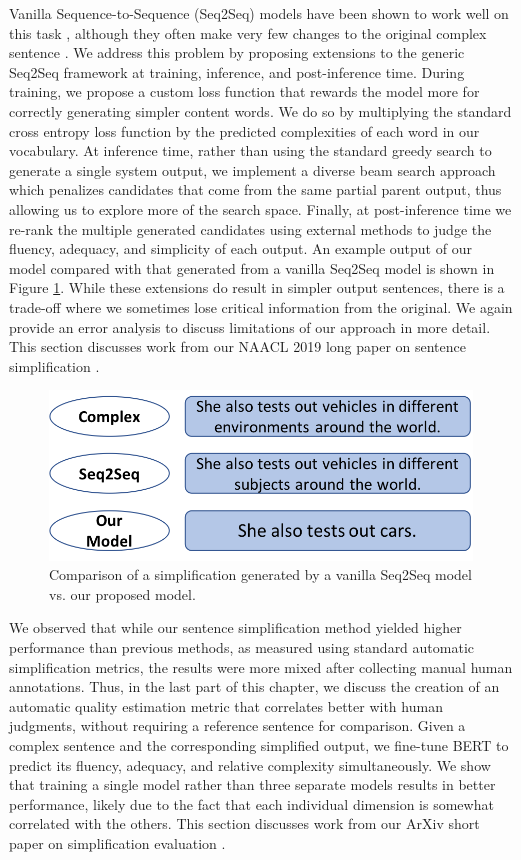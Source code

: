 \documentclass[thesis.tex]{subfiles}
\begin{document}
Vanilla Sequence-to-Sequence (Seq2Seq) models \citep{sutskever2014sequence} have been shown to work well on this task \citep{nisioi2017exploring}, although they often make very few changes to the original complex sentence \citep{zhang2017sentence}. We address this problem by proposing extensions to the generic Seq2Seq framework at training, inference, and post-inference time. During training, we propose a custom loss function that rewards the model more for correctly generating simpler content words. We do so by multiplying the standard cross entropy loss function by the predicted complexities of each word in our vocabulary. At inference time, rather than using the standard greedy search to generate a single system output, we implement a diverse beam search approach which penalizes candidates that come from the same partial parent output, thus allowing us to explore more of the search space. Finally, at post-inference time we re-rank the multiple generated candidates using external methods to judge the fluency, adequacy, and simplicity of each output. An example output of our model compared with that generated from a vanilla Seq2Seq model is shown in Figure \ref{fig:sentence-example}. While these extensions do result in simpler output sentences, there is a trade-off where we sometimes lose critical information from the original. We again provide an error analysis to discuss limitations of our approach in more detail. This section discusses work from our NAACL 2019 long paper on sentence simplification \citep{kriz2019complexity}.

\begin{figure}[H]
    \centering
\includegraphics[width=0.5\linewidth]{pictures/sentence-example.png}
\caption{Comparison of a simplification generated by a vanilla Seq2Seq model vs. our proposed model.}
\label{fig:sentence-example}
\end{figure}

We observed that while our sentence simplification method yielded higher performance than previous methods, as measured using standard automatic simplification metrics, the results were more mixed after collecting manual human annotations. Thus, in the last part of this chapter, we discuss the creation of an automatic quality estimation metric that correlates better with human judgments, without requiring a reference sentence for comparison. Given a complex sentence and the corresponding simplified output, we fine-tune BERT \citep{devlin2019bert} to predict its fluency, adequacy, and relative complexity simultaneously. We show that training a single model rather than three separate models results in better performance, likely due to the fact that each individual dimension is somewhat correlated with the others. This section discusses work from our ArXiv short paper on simplification evaluation \citep{kriz2020simple}.
\end{document}
